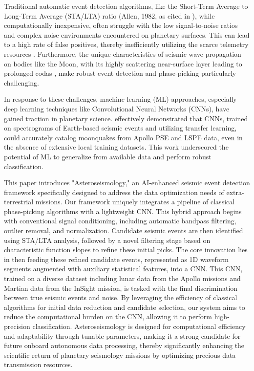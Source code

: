 \documentclass[conference]{IEEEtran}
\begin{document}
    Traditional automatic event detection algorithms, like the Short-Term Average to Long-Term Average (STA/LTA) ratio
    (Allen, 1982, as cited in \cite{Civilini2021}), while computationally inexpensive, often struggle with the low
    signal-to-noise ratios and complex noise environments encountered on planetary surfaces. This can lead to a high
    rate of false positives, thereby inefficiently utilizing the scarce telemetry resources \cite{Civilini2021}.
    Furthermore, the unique characteristics of seismic wave propagation on bodies like the Moon, with its highly
    scattering near-surface layer leading to prolonged codas \cite{Dainty1981, Nakamura1982} , make robust event
    detection and phase-picking particularly challenging.

    In response to these challenges, machine learning (ML) approaches, especially deep learning techniques like
    Convolutional Neural Networks (CNNs), have gained traction in planetary science. \cite{Civilini2021} effectively
    demonstrated that CNNs, trained on spectrograms of Earth-based seismic events and utilizing transfer learning, could
    accurately catalog moonquakes from Apollo PSE and LSPE data, even in the absence of extensive local training
    datasets. This work underscored the potential of ML to generalize from available data and perform robust
    classification.

    This paper introduces "Asteroseismology," an AI-enhanced seismic event detection framework specifically designed to
    address the data optimization needs of extra-terrestrial missions. Our framework uniquely integrates a pipeline of
    classical phase-picking algorithms with a lightweight CNN. This hybrid approach begins with conventional signal
    conditioning, including automatic bandpass filtering, outlier removal, and normalization. Candidate seismic events
    are then identified using STA/LTA analysis, followed by a novel filtering stage based on characteristic function
    slopes to refine these initial picks. The core innovation lies in then feeding these refined candidate events,
    represented as 1D waveform segments augmented with auxiliary statistical features, into a CNN. This CNN, trained on
    a diverse dataset including lunar data from the Apollo missions and Martian data from the InSight mission, is tasked
    with the final discrimination between true seismic events and noise. By leveraging the efficiency of classical
    algorithms for initial data reduction and candidate selection, our system aims to reduce the computational burden on
    the CNN, allowing it to perform high-precision classification. Asteroseismology is designed for computational
    efficiency and adaptability through tunable parameters, making it a strong candidate for future onboard autonomous
    data processing, thereby significantly enhancing the scientific return of planetary seismology missions by
    optimizing precious data transmission resources.
\end{document}
